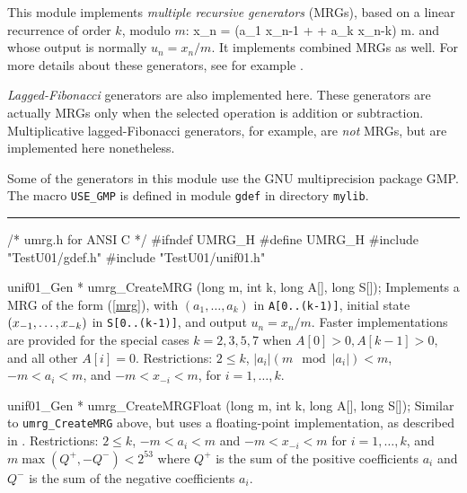 
This module implements {\em multiple recursive generators\/} (MRGs),
based on a linear recurrence of order $k$, modulo $m$:
\eq
   x_n = (a_1 x_{n-1} + \cdots + a_k x_{n-k}) \mod m.    
\endeq
and whose output is normally $u_n = x_n / m$.
It implements combined MRGs as well.
For more details about these generators, see for example
\cite {rLEC93a,rLEC94a,rLEC96b,rLEC99b,rLEC00b,rNIE92b}.

{\em Lagged-Fibonacci\/} generators are also implemented here.
These generators are actually MRGs only when the selected operation
is addition or subtraction.
Multiplicative lagged-Fibonacci generators, for example, are {\em not\/}
MRGs, but are implemented here nonetheless.

Some of the generators in this module use the GNU multiprecision package GMP.
The macro {\tt USE\_GMP} is defined in module {\tt gdef} in directory
{\tt mylib}.

\bigskip
\hrule
\code
\hide
/*  umrg.h  for ANSI C  */
#ifndef UMRG_H
#define UMRG_H
\endhide
#include "TestU01/gdef.h"
#include "TestU01/unif01.h"
\endcode




\code
unif01_Gen * umrg_CreateMRG (long m, int k, long A[], long S[]);
\endcode
  \tab  Implements a MRG of the form (\ref{mrg}), with
   $(a_1,\dots,a_k)$ in {\tt A[0..(k-1)]}, initial state
   $(x_{-1},\dots,\?x_{-k})$ in {\tt S[0..(k-1)]}, and output
   $u_n = x_n / m$.
%
   Faster implementations are provided for the special cases
   $k =2, 3, 5, 7$ when
   $A[0] > 0, A[k-1] > 0$, and all other $A[i] = 0$.
   Restrictions: $2 \le k$, $|a_i| (m \mod |a_i|) < m$,
   $-m < a_i < m$, and $-m < x_{-i} < m$, for $i = 1,\dots,k$.
 \endtab
\code


unif01_Gen * umrg_CreateMRGFloat (long m, int k, long A[], long S[]);
\endcode
  \tab Similar to {\tt umrg\_CreateMRG} above, but uses a floating-point
   implementation, as described in \cite{rLEC99b}.
   Restrictions: $2 \le k$,
   $-m < a_i < m$ and $-m < x_{-i} < m$ for $i = 1,\dots,k$, and
   $m \max (Q^+, -Q^-) < 2^{53}$
   where $Q^+$ is the sum of the positive coefficients $a_i$
   and $Q^-$ is the sum of the negative coefficients $a_i$.
 \endtab
\code


